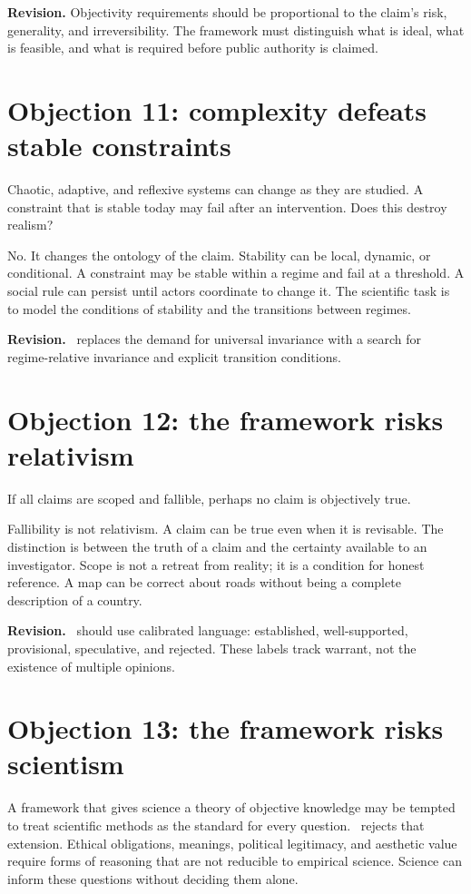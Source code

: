 \textbf{Revision.} Objectivity requirements should be proportional to the
claim's risk, generality, and irreversibility. The framework must distinguish
what is ideal, what is feasible, and what is required before public authority
is claimed.

\section{Objection 11: complexity defeats stable constraints}

Chaotic, adaptive, and reflexive systems can change as they are studied. A
constraint that is stable today may fail after an intervention. Does this
destroy realism?

No. It changes the ontology of the claim. Stability can be local, dynamic, or
conditional. A constraint may be stable within a regime and fail at a
threshold. A social rule can persist until actors coordinate to change it. The
scientific task is to model the conditions of stability and the transitions
between regimes.

\textbf{Revision.} \RCR\ replaces the demand for universal invariance with a
search for regime-relative invariance and explicit transition conditions.

\section{Objection 12: the framework risks relativism}

If all claims are scoped and fallible, perhaps no claim is objectively true.

Fallibility is not relativism. A claim can be true even when it is revisable.
The distinction is between the truth of a claim and the certainty available to
an investigator. Scope is not a retreat from reality; it is a condition for
honest reference. A map can be correct about roads without being a complete
description of a country.

\textbf{Revision.} \RCR\ should use calibrated language: established,
well-supported, provisional, speculative, and rejected. These labels track
warrant, not the existence of multiple opinions.

\section{Objection 13: the framework risks scientism}

A framework that gives science a theory of objective knowledge may be tempted
to treat scientific methods as the standard for every question. \RCR\ rejects
that extension. Ethical obligations, meanings, political legitimacy, and
aesthetic value require forms of reasoning that are not reducible to empirical
science. Science can inform these questions without deciding them alone.

